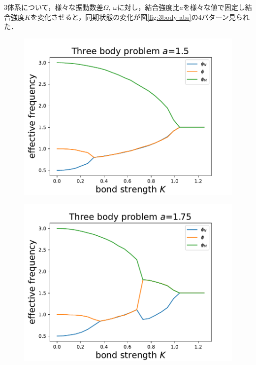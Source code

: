 \documentclass[../main]{subfiles}
\begin{document}
3体系について，様々な振動数差$\Omega,\ \omega$に対し，結合強度比$a$を様々な値で固定し結合強度$K$を変化させると，同期状態の変化が図\ref{fig:3body-abs}の4パターン見られた．
\begin{figure}[t]
    \begin{minipage}[b]{0.47\linewidth}
      \centering
      \includegraphics[keepaspectratio, scale=0.42]{images/three-body-prob-notapprox-a150.pdf}
      \label{fig:3body-notapprox150}
    \end{minipage}
    \begin{minipage}[b]{0.47\linewidth}
      \centering
      \includegraphics[keepaspectratio, scale=0.42]{images/three-body-prob-notapprox-a175.pdf}

\end{minipage}
\end{figure}
\end{document}
